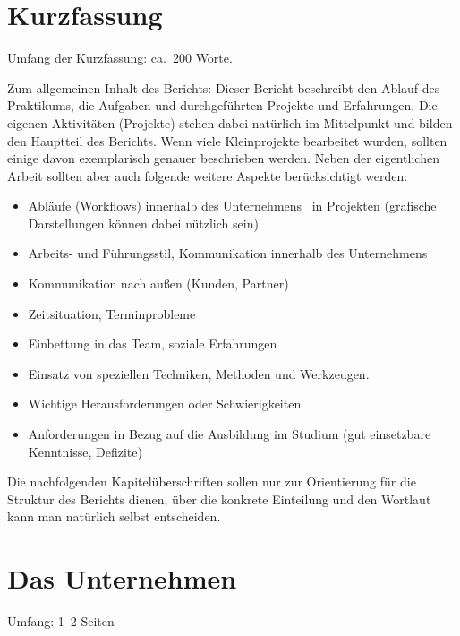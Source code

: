 \documentclass[praktikum,german]{hgbthesis}
\author{Peter A.\ Schlaumeier}
\begin{document}
\frontmatter
\maketitle
\tableofcontents

\chapter{Kurzfassung}
Umfang der Kurzfassung: ca.\ 200 Worte.

Zum allgemeinen Inhalt des Berichts: Dieser Bericht beschreibt den Ablauf des Praktikums, die Aufgaben und durchgeführten Projekte und Erfahrungen. Die eigenen Aktivitäten (Projekte) stehen dabei natürlich im Mittelpunkt und bilden den Hauptteil des Berichts. Wenn viele Kleinprojekte bearbeitet wurden, sollten einige davon exemplarisch
genauer beschrieben werden. Neben der eigentlichen Arbeit sollten aber auch folgende weitere Aspekte berücksichtigt werden:
%
\begin{itemize}
\item Abläufe (Workflows) innerhalb des Unternehmens \bzw\ in Projekten (grafische Darstellungen
können dabei nützlich sein)
\item Arbeits- und Führungsstil, Kommunikation innerhalb des Unternehmens
\item Kommunikation nach außen (Kunden, Partner)
\item Zeitsituation, Terminprobleme
\item Einbettung in das Team, soziale Erfahrungen
\item Einsatz von speziellen Techniken, Methoden und Werkzeugen.
\item Wichtige Herausforderungen oder Schwierigkeiten
\item Anforderungen in Bezug auf die Ausbildung im Studium (gut einsetzbare Kenntnisse, Defizite)
\end{itemize}
%
Die nachfolgenden Kapitelüberschriften sollen nur zur Orientierung für die Struktur des Berichts dienen, über die konkrete Einteilung und den Wortlaut kann man natürlich selbst entscheiden.

\mainmatter           %

\chapter{Das Unternehmen}
Umfang: 1--2 Seiten
\end{document}
